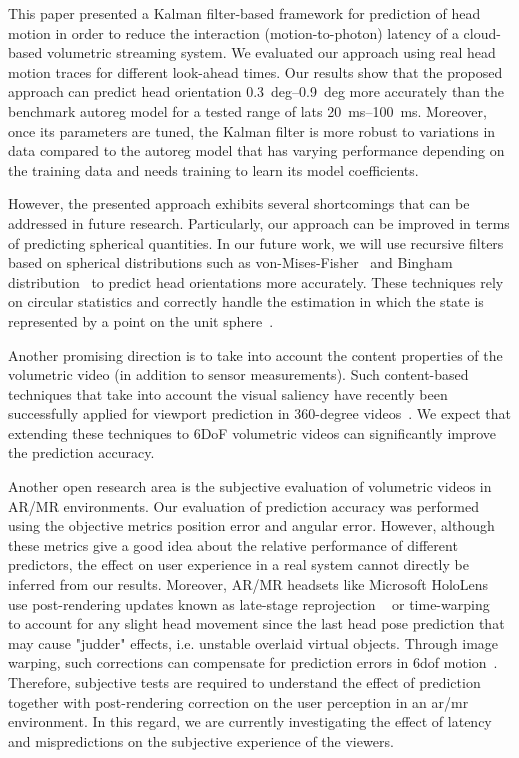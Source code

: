 \documentclass[sigconf]{acmart}			%
\begin{document}
This paper presented a Kalman filter-based framework for prediction of head motion in order to reduce the interaction (motion-to-photon) latency of a cloud-based volumetric streaming system.
We evaluated our approach using real head motion traces for different look-ahead times.
Our results show that the proposed approach can predict head orientation  \SIrange{0.3}{0.9}{deg} more accurately than the benchmark \gls{autoreg} model for a tested range of \glspl{lat} \SIrange{20}{100}{ms}.
Moreover, once its parameters are tuned, the Kalman filter is more robust to variations in data compared to the \gls{autoreg} model that has varying performance depending on the training data and needs training to learn its model coefficients. 

However, the presented approach exhibits several shortcomings that can be addressed in future research.
Particularly, our approach can be improved in terms of predicting spherical quantities.
In our future work, we will use recursive filters based on spherical distributions such as von-Mises-Fisher~\cite{kurz2016unscented} and Bingham distribution~\cite{kurz2016unscented} to predict head orientations more accurately.
These techniques rely on circular statistics and correctly handle the estimation in which the state is represented by a point on the unit sphere~\cite{kurz2016}.

Another promising direction is to take into account the content properties of the volumetric video (in addition to sensor measurements).
Such content-based techniques that take into account the visual saliency have recently been successfully applied for viewport prediction in 360-degree videos~\cite{aladagli2017, nguyen2018, ozcinar2019}.
We expect that extending these techniques to 6DoF volumetric videos can significantly improve the prediction accuracy.

Another open research area is the subjective evaluation of volumetric videos in AR/MR environments.
Our evaluation of prediction accuracy was performed using the objective metrics position error and angular error. 
However, although these metrics give a good idea about the relative performance of different predictors, the effect on user experience in a real system cannot directly be inferred from our results. 
Moreover, AR/MR headsets like Microsoft HoloLens use post-rendering updates known as late-stage reprojection ~\cite{hololens_lsr} or time-warping~\cite{timewarp} to account for any slight head movement since the last head pose prediction that may cause "judder" effects, i.e. unstable overlaid virtual objects.
Through image warping, such corrections can compensate for prediction errors in \gls{6dof} motion~\cite{mark1997}.
Therefore, subjective tests are required to understand the effect of prediction together with post-rendering correction on the user perception in an \gls{ar}/\gls{mr} environment.
In this regard, we are currently investigating the effect of latency and mispredictions on the subjective experience of the viewers.



%
\end{document}
